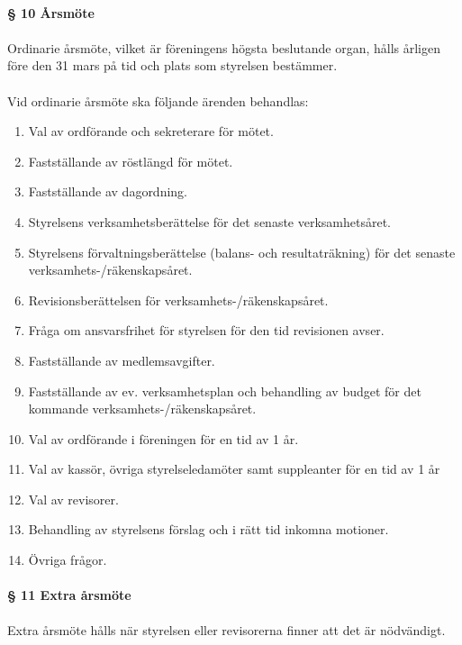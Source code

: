 \documentclass[12pt, a4paper]{article}
\begin{document}
\paragraph{§ 10 Årsmöte}
\paragraph{}
Ordinarie årsmöte, vilket är föreningens högsta beslutande organ, hålls årligen före den 31 mars på tid och plats som styrelsen bestämmer.

\paragraph{}
Vid ordinarie årsmöte ska följande ärenden behandlas:
\begin{enumerate}
\item Val av ordförande och sekreterare för mötet.
\item Fastställande av röstlängd för mötet.
\item Fastställande av dagordning.
\item Styrelsens verksamhetsberättelse för det senaste verksamhetsåret.
\item Styrelsens förvaltningsberättelse (balans- och resultaträkning) för det senaste verksamhets-/räkenskapsåret.
\item Revisionsberättelsen för verksamhets-/räkenskapsåret.
\item Fråga om ansvarsfrihet för styrelsen för den tid revisionen avser.
\item Fastställande av medlemsavgifter.
\item Fastställande av ev. verksamhetsplan och behandling av budget för det kommande verksamhets-/räkenskapsåret.
\item Val av ordförande i föreningen för en tid av 1 år.
\item Val av kassör, övriga styrelseledamöter samt suppleanter för en tid av 1 år
\item Val av revisorer.
\item Behandling av styrelsens förslag och i rätt tid inkomna motioner.
\item Övriga frågor. 
\end{enumerate}

\paragraph{§ 11 Extra årsmöte}
\paragraph{}
Extra årsmöte hålls när styrelsen eller revisorerna finner att det är nödvändigt.
\end{document}
